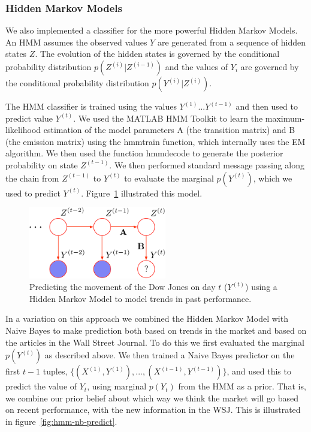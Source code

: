 \documentclass[10pt, twocolumn]{article}
\def\TODO#1{\noindent\textbf{[TODO:} #1]}
\begin{document}
\subsubsection{Hidden Markov Models}
\label{sec:hmm}

We also implemented a classifier for the more powerful Hidden Markov Models. An HMM assumes the observed values $Y$ are generated from a sequence of hidden states $Z$.
The evolution of the hidden states is governed by the conditional probability distribution $p(Z^{(i)}|Z^{(i-1)})$ and the values of $Y_{i}$ are governed by the conditional probability distribution $p(Y^{(i)}|Z^{(i)})$.

The HMM classifier is trained using the values $Y^{(1)}...Y^{(t-1)}$ and then used to predict value $Y^{(t)}$.
We used the MATLAB HMM Toolkit to learn the maximum-likelihood estimation of the model parameters A (the transition matrix) and B (the emission matrix) using the hmmtrain function, which internally uses the EM algorithm.
We then used the function hmmdecode to generate the posterior probability on state $Z^{(t-1)}$.
We then performed standard message passing along the chain from $Z^{(t-1)}$ to $Y^{(t)}$ to evaluate the marginal $p(Y^{(t)})$, which we used to predict $Y^{(t)}$.
Figure~\ref{fig:hmm-predict} illustrated this model.

\begin{figure}
\center
\includegraphics[width=6cm]{figs/hmm-predict.pdf}
\caption{Predicting the movement of the Dow Jones on day $t$ ($Y^{(t)}$) using a Hidden Markov Model to model trends in past performance.}
\label{fig:hmm-predict}
\end{figure}

In a variation on this approach we combined the Hidden Markov Model with Naive Bayes to make prediction both based on trends in the market and based on the articles in the Wall Street Journal.
To do this we first evaluated the marginal $p(Y^{(t)})$ as described above.
We then trained a Naive Bayes predictor on the first $t-1$ tuples, $\{(X^{(1)},Y^{(1)}), ..., (X^{(t-1)},Y^{(t-1)})\}$, and used this to predict the value of $Y_{t}$, using marginal $p(Y_{t})$ from the HMM as a prior.
That is, we combine our prior belief about which way we think the market will go based on recent performance, with the new information in the WSJ.
This is illustrated in figure~\ref{fig:hmm-nb-predict}. 
\end{document}
